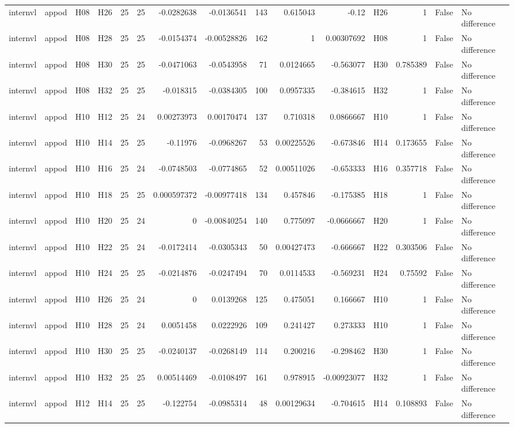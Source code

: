 \begin{longtable}{llllrrrrrrrlrrl}
internvl & appod & H08 & H26 & 25 & 25 & -0.0282638 & -0.0136541 & 143 & 0.615043 & -0.12 & H26 & 1 & False & No difference \\
internvl & appod & H08 & H28 & 25 & 25 & -0.0154374 & -0.00528826 & 162 & 1 & 0.00307692 & H08 & 1 & False & No difference \\
internvl & appod & H08 & H30 & 25 & 25 & -0.0471063 & -0.0543958 & 71 & 0.0124665 & -0.563077 & H30 & 0.785389 & False & No difference \\
internvl & appod & H08 & H32 & 25 & 25 & -0.018315 & -0.0384305 & 100 & 0.0957335 & -0.384615 & H32 & 1 & False & No difference \\
internvl & appod & H10 & H12 & 25 & 24 & 0.00273973 & 0.00170474 & 137 & 0.710318 & 0.0866667 & H10 & 1 & False & No difference \\
internvl & appod & H10 & H14 & 25 & 25 & -0.11976 & -0.0968267 & 53 & 0.00225526 & -0.673846 & H14 & 0.173655 & False & No difference \\
internvl & appod & H10 & H16 & 25 & 24 & -0.0748503 & -0.0774865 & 52 & 0.00511026 & -0.653333 & H16 & 0.357718 & False & No difference \\
internvl & appod & H10 & H18 & 25 & 25 & 0.000597372 & -0.00977418 & 134 & 0.457846 & -0.175385 & H18 & 1 & False & No difference \\
internvl & appod & H10 & H20 & 25 & 24 & 0 & -0.00840254 & 140 & 0.775097 & -0.0666667 & H20 & 1 & False & No difference \\
internvl & appod & H10 & H22 & 25 & 24 & -0.0172414 & -0.0305343 & 50 & 0.00427473 & -0.666667 & H22 & 0.303506 & False & No difference \\
internvl & appod & H10 & H24 & 25 & 25 & -0.0214876 & -0.0247494 & 70 & 0.0114533 & -0.569231 & H24 & 0.75592 & False & No difference \\
internvl & appod & H10 & H26 & 25 & 24 & 0 & 0.0139268 & 125 & 0.475051 & 0.166667 & H10 & 1 & False & No difference \\
internvl & appod & H10 & H28 & 25 & 24 & 0.0051458 & 0.0222926 & 109 & 0.241427 & 0.273333 & H10 & 1 & False & No difference \\
internvl & appod & H10 & H30 & 25 & 25 & -0.0240137 & -0.0268149 & 114 & 0.200216 & -0.298462 & H30 & 1 & False & No difference \\
internvl & appod & H10 & H32 & 25 & 25 & 0.00514469 & -0.0108497 & 161 & 0.978915 & -0.00923077 & H32 & 1 & False & No difference \\
internvl & appod & H12 & H14 & 25 & 25 & -0.122754 & -0.0985314 & 48 & 0.00129634 & -0.704615 & H14 & 0.108893 & False & No difference \\

\end{longtable}
